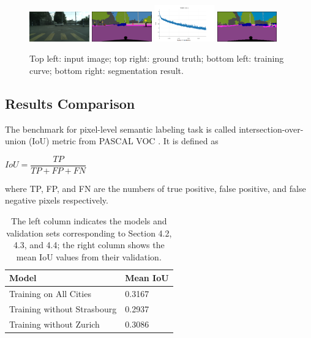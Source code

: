 \documentclass[10pt,twocolumn,letterpaper]{article}
\begin{document}
\begin{figure}[h]
	\centering
	\includegraphics[width=0.23\textwidth]{zurich.png}
	\includegraphics[width=0.23\textwidth]{zurich_gt.png}
	\includegraphics[width=0.23\textwidth]{curve_without_zurich.png}
	\includegraphics[width=0.23\textwidth]{zurich_seg.png}
	\caption{Top left: input image; top right: ground truth; bottom left: training curve; bottom right: segmentation result.}
	\label{fig:figure4}
\end{figure}

\subsection{Results Comparison}
The benchmark for pixel-level semantic labeling task is called intersection-over-union (IoU) metric from PASCAL VOC \cite{everingham2015pascal}. It is defined as
\begin{center}
	$IoU=\dfrac{TP}{TP+FP+FN}$
\end{center}
where TP, FP, and FN are the numbers of true positive, false positive, and false negative pixels respectively.

\begin{table}[h]
	\begin{center}
		\begin{tabular}{ | l | p{2cm} | }
			\hline
			Model & Mean IoU\\ \hline \hline
			Training on All Cities & 0.3167\\ \hline
			Training without Strasbourg & 0.2937\\ \hline
			Training without Zurich & 0.3086\\
			\hline
		\end{tabular}
	\end{center}
	\caption{The left column indicates the models and validation sets corresponding to Section 4.2, 4.3, and 4.4; the right column shows the mean IoU values from their validation.} \label{tab:table2}
\end{table}
\end{document}
